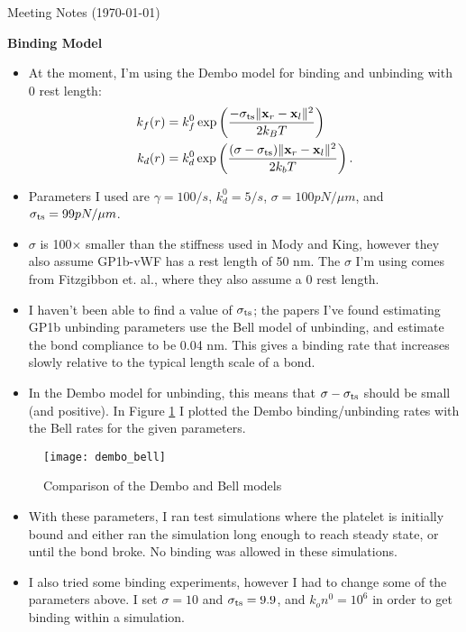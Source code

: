 \documentclass{article}
\newcommand{\tn}{\textnormal}
\newcommand{\vect}[1]{\boldsymbol{\mathbf{#1}}}
\begin{document}
\pagestyle{plain}

\begin{center}
  {\Large Meeting Notes (\today)}
\end{center}

\textbf{Binding Model}

\begin{itemize}
\item At the moment, I'm using the Dembo model for binding and unbinding
  with 0 rest length:
  \begin{align*}
    k_f(r) &= k_f^0 \exp\left(\frac{-\sigma_\tn{ts} \|\vect{x}_r -
             \vect{x}_l\|^2}{2k_B T}\right) \\
    k_d(r) &= k_d^0 \exp\left(\frac{(\sigma - \sigma_\tn{ts})\|\vect{x}_r -
             \vect{x}_l\|^2}{2k_b T}\right).
  \end{align*}
\item Parameters I used are $\gamma = 100 / s$, $k_d^0 = 5 / s$,
  $\sigma = 100 pN / \mu m$, and $\sigma_\tn{ts} = 99 pN / \mu m$.
\item $\sigma$ is 100$\times$ smaller than the stiffness used in Mody
  and King, however they also assume GP1b-vWF has a rest length of 50
  nm. The $\sigma$ I'm using comes from Fitzgibbon et. al., where they
  also assume a 0 rest length.
\item I haven't been able to find a value of $\sigma_\tn{ts}$; the papers
  I've found estimating GP1b unbinding parameters use the Bell model
  of unbinding, and estimate the bond compliance to be 0.04 nm. This
  gives a binding rate that increases slowly relative to the typical
  length scale of a bond.
\item In the Dembo model for unbinding, this means that
  $\sigma - \sigma_\tn{ts}$ should be small (and positive). In Figure
  \ref{fig:binding-models} I plotted the Dembo binding/unbinding rates
  with the Bell rates for the given parameters.
\end{itemize}

\begin{figure}
  \centering
  \texttt{[image: dembo\_bell]}
  \caption{Comparison of the Dembo and Bell models}
  \label{fig:binding-models}
\end{figure}

\begin{itemize}
\item With these parameters, I ran test simulations where the platelet
  is initially bound and either ran the simulation long enough to
  reach steady state, or until the bond broke. No binding was allowed
  in these simulations.
\item I also tried some binding experiments, however I had to change
  some of the parameters above. I set $\sigma = 10$ and $\sigma_\tn{ts} =
  9.9$, and $k_on^0 = 10^6$ in order to get binding within a simulation.
\end{itemize}
\end{document}
